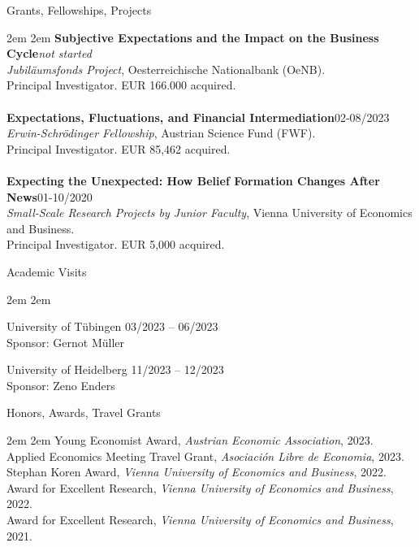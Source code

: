 \documentclass{resume} %
\begin{document}
\vspace{0.2cm}
{\large Grants, Fellowships, Projects}
\par \begingroup \leftskip2em \rightskip2em \vspace{-0.2cm}
    \textbf{Subjective Expectations and the Impact on the Business Cycle}\hfill \textit{not started}\\
    \textit{Jubil\"{a}umsfonds Project}, Oesterreichische Nationalbank (OeNB).\\
    Principal Investigator. EUR 166.000 acquired.\\\\
    \textbf{Expectations, Fluctuations, and Financial Intermediation}\hfill 02-08/2023\\
    \textit{Erwin-Schr\"{o}dinger Fellowship}, Austrian Science Fund (FWF).\\
    Principal Investigator. EUR 85,462 acquired.\\\\
    \textbf{Expecting the Unexpected: How Belief Formation Changes After News}\hfill 01-10/2020\\
    \textit{Small-Scale Research Projects by Junior Faculty}, Vienna University of Economics and Business.\\
    Principal Investigator. EUR 5,000 acquired.
\par \endgroup
\clearpage
\vspace{0.2cm}
{\large Academic Visits}
\par \begingroup \leftskip2em \rightskip2em \vspace{-0.2cm}
    \par \begingroup
    University of T\"{u}bingen \hfill 03/2023 -- 06/2023 \\
    Sponsor: Gernot M\"{u}ller
    \par \endgroup
    \par \begingroup
    University of Heidelberg \hfill 11/2023 -- 12/2023 \\
    Sponsor: Zeno Enders
    \par \endgroup
\par \endgroup

\vspace{0.2cm}
{\large Honors, Awards, Travel Grants}
\par \begingroup \leftskip2em \rightskip2em \vspace{-0.2cm}
    Young Economist Award, \textit{Austrian Economic Association}, 2023. \\
    Applied Economics Meeting Travel Grant, \textit{Asociaci\'on Libre de Economia}, 2023.\\
    Stephan Koren Award, \textit{Vienna University of Economics and Business}, 2022. \\
    Award for Excellent Research, \textit{Vienna University of Economics and Business}, 2022. \\
    Award for Excellent Research, \textit{Vienna University of Economics and Business}, 2021.
\par \endgroup
\end{document}
